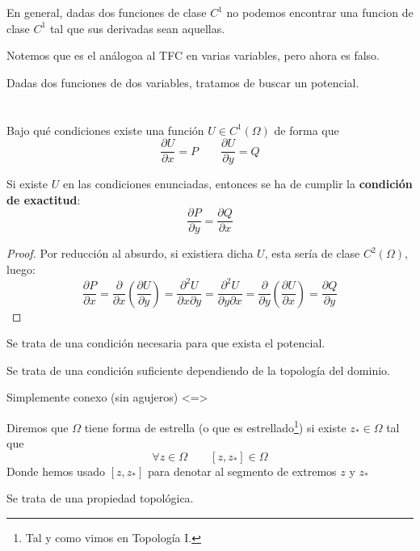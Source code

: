 En general, dadas dos funciones de clase $C^1$ no podemos encontrar una funcion de clase $C^1$ tal que sus derivadas sean aquellas.

Notemos que es el análogoa al TFC en varias variables, pero ahora es falso.


Dadas dos funciones de dos variables, tratamos de buscar un potencial.

\section{} %

Bajo qué condiciones existe una función $U\in C^1(\Omega)$ de forma que
\begin{equation*}
    \dfrac{\partial U}{\partial x} = P \qquad \dfrac{\partial U}{\partial y} = Q 
\end{equation*}

\begin{prop}
    Si existe $U$ en las condiciones enunciadas, entonces se ha de cumplir la \textbf{condición de exactitud}:
    \begin{equation*}
        \dfrac{\partial P}{\partial y} = \dfrac{\partial Q}{\partial x}
    \end{equation*}
    \begin{proof}
        Por reducción al absurdo, si existiera dicha $U$, esta sería de clase $C^2(\Omega)$, luego:
        \begin{equation*}
            \dfrac{\partial P}{\partial x} = \dfrac{\partial }{\partial x}\left(\dfrac{\partial U}{\partial y}\right)= \dfrac{\partial^2 U}{\partial x\partial y} = \dfrac{\partial^2 U}{\partial y \partial x} = \dfrac{\partial}{\partial y}\left(\dfrac{\partial U}{\partial x}\right) = \dfrac{\partial Q}{\partial y}
        \end{equation*}
    \end{proof}
\end{prop}
Se trata de una condición necesaria para que exista el potencial.

Se trata de una condición suficiente dependiendo de la topología del dominio.

Simplemente conexo (sin agujeros) <=>

\begin{definicion}
    Diremos que $\Omega$ tiene forma de estrella (o que es estrellado\footnote{Tal y como vimos en Topología I.}) si existe $z_\ast \in \Omega$ tal que 
    \begin{equation*}
        \forall z\in \Omega \qquad [z,z_\ast] \in \Omega
    \end{equation*}
    Donde hemos usado $[z,z_\ast]$ para denotar al segmento de extremos $z$ y $z_\ast$
\end{definicion}
Se trata de una propiedad topológica.

